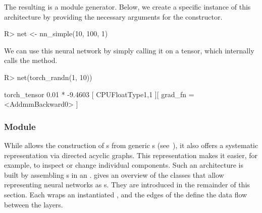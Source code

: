 \documentclass[article,shortnames]{jss}
\theoremstyle{definition}
\renewenvironment{CodeChunk}{\par\addvspace{0.6\baselineskip}\noindent\begin{minipage}{\linewidth}}{\end{minipage}\par\vspace{0.6\baselineskip}}
\begin{document}
\begin{CodeChunk}
\end{CodeChunk}

The resulting  is a module generator.
Below, we create a specific instance of this architecture by providing the necessary arguments for the constructor.

\begin{CodeChunk}
\begin{CodeInput}
R> net <- nn_simple(10, 100, 1)
\end{CodeInput}
\end{CodeChunk}

We can use this neural network by simply calling it on a tensor, which internally calls the  method.

\begin{CodeChunk}
\begin{CodeInput}
R> net(torch_randn(1, 10))
\end{CodeInput}

\begin{CodeOutput}
torch_tensor
0.01 *
-9.4603
[ CPUFloatType{1,1} ][ grad_fn = <AddmmBackward0> ]
\end{CodeOutput}
\end{CodeChunk}

\subsubsection[Module Graph]{Module }

While  allows the construction of s from generic s (see~), it also offers a systematic representation via directed acyclic graphs. This representation makes it easier, for example, to inspect or change individual components.
Such an architecture is built by assembling s in an .
 gives an overview of the classes that allow representing neural networks as s.
They are introduced in the remainder of this section.
Each  wraps an instantiated , and the edges of the  define the data flow between the layers.
\end{document}
